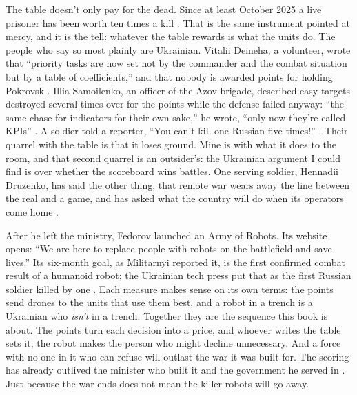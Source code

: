 The table doesn't only pay for the dead. Since at least October 2025 a live prisoner has been worth ten times a kill \autocite{mintsyfra2025bonus,nikolaienko2025jackpot}. That is the same instrument pointed at mercy, and it is the tell: whatever the table rewards is what the units do. The people who say so most plainly are Ukrainian. Vitalii Deineha, a volunteer, wrote that “priority tasks are now set not by the commander and the combat situation but by a table of coefficients,” and that nobody is awarded points for holding Pokrovsk \autocite{deineha2025ebaly}. Illia Samoilenko, an officer of the Azov brigade, described easy targets destroyed several times over for the points while the defense failed anyway: “the same chase for indicators for their own sake,” he wrote, “only now they're called KPIs” \autocite{ukrmilitary2025samoilenko}. A soldier told a reporter, “You can't kill one Russian five times!” \autocite{zvarych2025ebaly}. Their quarrel with the table is that it loses ground. Mine is with what it does to the room, and that second quarrel is an outsider's: the Ukrainian argument I could find is over whether the scoreboard wins battles. One serving soldier, Hennadii Druzenko, has said the other thing, that remote war wears away the line between the real and a game, and has asked what the country will do when its operators come home \autocite{hvylya2026druzenko}.

After he left the ministry, Fedorov launched an Army of Robots. Its website opens: “We are here to replace people with robots on the battlefield and save lives.” Its six-month goal, as Militarnyi reported it, is the first confirmed combat result of a humanoid robot; the Ukrainian tech press put that as the first Russian soldier killed by one \autocite{shumlianskyi2026robots,shtokaliuk2026robots,kesteloo2026robots}. Each measure makes sense on its own terms: the points send drones to the units that use them best, and a robot in a trench is a Ukrainian who \emph{isn't} in a trench. Together they are the sequence this book is about. The points turn each decision into a price, and whoever writes the table sets it; the robot makes the person who might decline unnecessary. And a force with no one in it who can refuse will outlast the war it was built for. The scoring has already outlived the minister who built it and the government he served in \autocite{modua2026october,khotyn2026government}. Just because the war ends does not mean the killer robots will go away.

